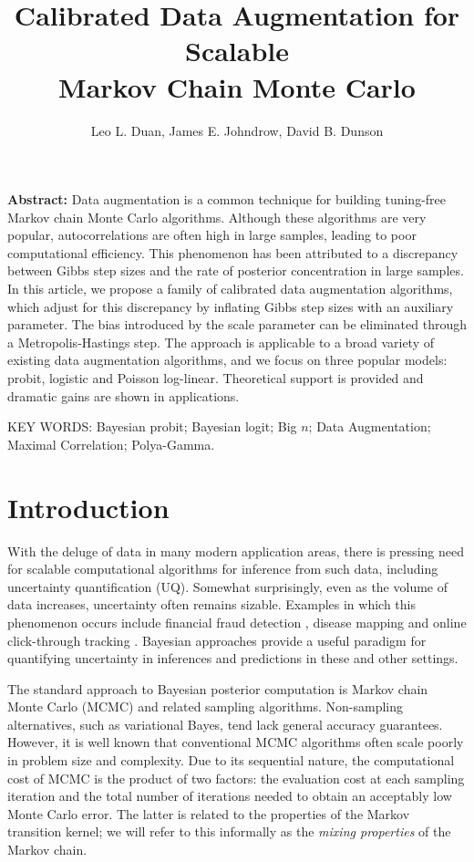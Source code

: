 \documentclass[10pt]{article}
\title
{{Calibrated Data Augmentation for Scalable \\ Markov Chain Monte Carlo}}
\author{
     Leo L. Duan,
     James E. Johndrow,
     David B. Dunson
}
\begin{document}
    
\maketitle

{\bf Abstract:} Data augmentation is a common technique for building tuning-free Markov chain Monte Carlo algorithms. Although these algorithms are very popular, 
autocorrelations are often high in large samples, leading to poor computational efficiency.  This phenomenon has been attributed to a discrepancy between Gibbs step sizes and the rate of posterior concentration in large samples.  In this article, we propose a family of calibrated data augmentation algorithms, which adjust for this discrepancy by inflating Gibbs step sizes with an auxiliary parameter. The bias introduced by the scale parameter can be eliminated through a Metropolis-Hastings step. The approach is applicable to a broad variety of existing data augmentation algorithms, and we focus on three popular models: probit, logistic and Poisson log-linear.  Theoretical support is provided and dramatic gains are shown in applications.
\vskip 12pt

{\noindent  KEY WORDS:  Bayesian probit; Bayesian logit; Big $n$; Data Augmentation; Maximal Correlation; Polya-Gamma.}
{}

\section{Introduction}

With the deluge of data in many modern application areas, there is pressing need for scalable computational algorithms for inference from such data, including uncertainty quantification (UQ).  Somewhat surprisingly, even as the volume of data increases, uncertainty often remains sizable.  Examples in which this phenomenon occurs include financial fraud detection \citep{ngai2011application}, disease mapping \citep{wakefield2007disease} and online click-through tracking \citep{wang2010click}.  Bayesian approaches provide a useful paradigm for quantifying uncertainty in inferences and predictions in these and other settings.

The standard approach to Bayesian posterior computation is Markov chain Monte Carlo (MCMC) and related sampling algorithms. Non-sampling alternatives, such as variational Bayes, tend lack general accuracy guarantees. However, it is well known that conventional MCMC algorithms often scale poorly in problem size and complexity. Due to its sequential nature, the computational cost of MCMC is the product of two factors: the evaluation cost at each sampling iteration and the total number of iterations needed to obtain an acceptably low Monte Carlo error. The latter is related to the properties of the Markov transition kernel; we will refer to this informally as the \emph{mixing properties} of the Markov chain. 
\end{document}
